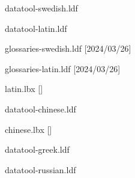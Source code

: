 \begin{filecontents*}{datatool-swedish.ldf}
\end{filecontents*}
\begin{filecontents*}{datatool-latin.ldf}
\end{filecontents*}
\begin{filecontents*}{glossaries-swedish.ldf}
[2024/03/26]
\renewcommand*{\glossaryname}{Ordlista}
\renewcommand*{\acronymname}{Akronymer}
\renewcommand*{\entryname}{Term}
\renewcommand*{\descriptionname}{Beskrivning}
\end{filecontents*}
\begin{filecontents*}{glossaries-latin.ldf}
[2024/03/26]
\end{filecontents*}
\begin{filecontents*}{latin.lbx}
    [\abx@lbxid]


\end{filecontents*}

\begin{filecontents*}{datatool-chinese.ldf}
\end{filecontents*}
\begin{filecontents*}{chinese.lbx}
    [\abx@lbxid]
\end{filecontents*}

\begin{filecontents*}{datatool-greek.ldf}
\end{filecontents*}
\begin{filecontents*}{datatool-russian.ldf}
\end{filecontents*}
